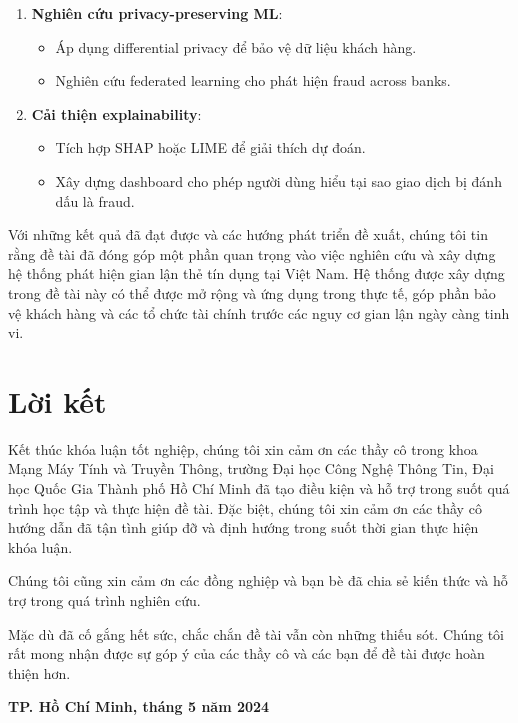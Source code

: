 \begin{enumerate}
    \item \textbf{Nghiên cứu privacy-preserving ML}:
    \begin{itemize}
        \item Áp dụng differential privacy để bảo vệ dữ liệu khách hàng.
        \item Nghiên cứu federated learning cho phát hiện fraud across banks.
    \end{itemize}
    
    \item \textbf{Cải thiện explainability}:
    \begin{itemize}
        \item Tích hợp SHAP hoặc LIME để giải thích dự đoán.
        \item Xây dựng dashboard cho phép người dùng hiểu tại sao giao dịch bị đánh dấu là fraud.
    \end{itemize}
\end{enumerate}

Với những kết quả đã đạt được và các hướng phát triển đề xuất, chúng tôi tin rằng đề tài đã đóng góp một phần quan trọng vào việc nghiên cứu và xây dựng hệ thống phát hiện gian lận thẻ tín dụng tại Việt Nam. Hệ thống được xây dựng trong đề tài này có thể được mở rộng và ứng dụng trong thực tế, góp phần bảo vệ khách hàng và các tổ chức tài chính trước các nguy cơ gian lận ngày càng tinh vi.

\section{Lời kết}

Kết thúc khóa luận tốt nghiệp, chúng tôi xin cảm ơn các thầy cô trong khoa Mạng Máy Tính và Truyền Thông, trường Đại học Công Nghệ Thông Tin, Đại học Quốc Gia Thành phố Hồ Chí Minh đã tạo điều kiện và hỗ trợ trong suốt quá trình học tập và thực hiện đề tài. Đặc biệt, chúng tôi xin cảm ơn các thầy cô hướng dẫn đã tận tình giúp đỡ và định hướng trong suốt thời gian thực hiện khóa luận.

Chúng tôi cũng xin cảm ơn các đồng nghiệp và bạn bè đã chia sẻ kiến thức và hỗ trợ trong quá trình nghiên cứu.

Mặc dù đã cố gắng hết sức, chắc chắn đề tài vẫn còn những thiếu sót. Chúng tôi rất mong nhận được sự góp ý của các thầy cô và các bạn để đề tài được hoàn thiện hơn.

\begin{center}
\textbf{TP. Hồ Chí Minh, tháng 5 năm 2024}
\end{center}
